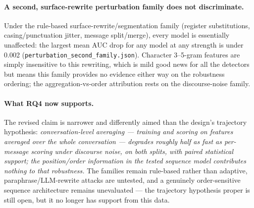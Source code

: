 \documentclass[11pt]{article}
\begin{document}
\begin{table}[!htbp]
\centering
\footnotesize

\caption{Aggregation and order controls (author-disjoint split, discourse noise, 5 seeds). Clean AUC and mean AUC drop per strength. The conversation-mean control is the sequence model without position weights. Source: \texttt{perturbation\_model\_controls.json}.}
\label{tab:controls}
\end{table}

\begin{table}[!htbp]
\centering
\scriptsize

\caption{Paired stratified bootstrap ($B{=}1000$) 95\% CIs for (sequence AUC drop $-$ comparator AUC drop); negative favors the sequence model; $^*$ marks CIs excluding zero. Source: \texttt{perturbation\_paired\_tests.json}.}
\label{tab:paired}
\end{table}

\paragraph{A second, surface-rewrite perturbation family does not discriminate.}
Under the rule-based surface-rewrite/segmentation family (register substitutions, casing/punctuation jitter, message split/merge), every model is essentially unaffected: the largest mean AUC drop for any model at any strength is under 0.002 (\texttt{perturbation\_second\_family.json}). Character 3--5-gram features are simply insensitive to this rewriting, which is mild good news for all the detectors but means this family provides no evidence either way on the robustness ordering; the aggregation-vs-order attribution rests on the discourse-noise family.

\paragraph{What RQ4 now supports.}
The revised claim is narrower and differently aimed than the design's trajectory hypothesis: \emph{conversation-level averaging --- training and scoring on features averaged over the whole conversation --- degrades roughly half as fast as per-message scoring under discourse noise, on both splits, with paired statistical support; the position/order information in the tested sequence model contributes nothing to that robustness.} The families remain rule-based rather than adaptive, paraphrase/LLM-rewrite attacks are untested, and a genuinely order-sensitive sequence architecture remains unevaluated --- the trajectory hypothesis proper is still open, but it no longer has support from this data.
\end{document}
